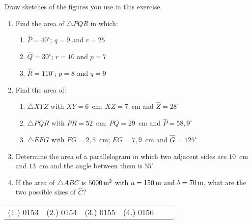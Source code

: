 {
Draw sketches of the figures you use in this exercise. 
\begin{enumerate}
\item Find the area of $\triangle PQR$ in which: \begin{enumerate} \item $\hat{P} = 40^{\circ}$; $q=9$ and $r=25$ \item $\hat{Q} = 30^{\circ}$; $r=10$ and $p=7$ 
\item $\hat{R} = 110^{\circ}$; $p=8$ and $q=9$ \end{enumerate}
\item Find the area of: \begin{enumerate} 
\item $\triangle XYZ$ with $XY=6$~cm; $XZ=7$~cm and $\hat{Z} = 28^{\circ}$ 
\item $\triangle PQR$ with $PR=52$~cm; $PQ=29$~cm and $\hat{P} = 58,9^{\circ}$ 
\item $\triangle EFG$ with $FG=2,5$~cm; $EG=7,9$~cm and $\hat{G} = 125^\circ$ \end{enumerate}
\item Determine the area of a parallelogram in which two adjacent sides are $10$~cm and $13$~cm and the angle between them is $55^{\circ}$.
\item If the area of $\triangle ABC$ is $5 000\,\rm{m}^2$ with $a=150\,\rm{m}$ and $b = 70\,\rm{m}$, what are the two possible sizes of $\hat{C}$? 
\end{enumerate}


\practiceinfo
\par \begin{tabular}[h]{cccccc}
(1.)	0153	&
(2.)	0154	&
(3.)	0155	&
(4.)	0156	&
\end{tabular}}

